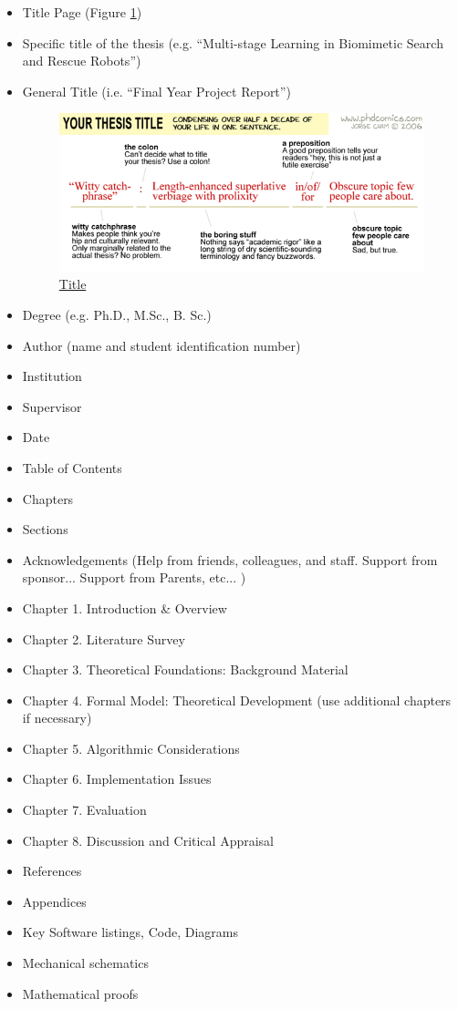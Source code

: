 \begin{itemize}
    \item Title Page (Figure \ref{fig:phd-title.png})
    \item Specific title of the thesis (e.g. “Multi-stage Learning in Biomimetic Search and Rescue Robots”)
    \item General Title (i.e. “Final Year Project Report”)
\begin{figure}[H]
    \centering
    \includegraphics[scale=0.9]{Figures/phd-title.png}
    \caption[Title]{\href{http://phdcomics.com/comics/archive_print.php?comicid=718}{Title}}
    \label{fig:phd-title.png}
\end{figure}

    \item Degree (e.g. Ph.D., M.Sc., B. Sc.)
    \item Author (name and student identification number)
    \item Institution 
    \item Supervisor
    \item Date
    \item Table of Contents
    \item Chapters
    \item Sections
    \item Acknowledgements (Help from friends, colleagues, and staff. Support from sponsor... Support from Parents, etc... )
     \item Chapter 1. Introduction & Overview
    \item Chapter 2. Literature Survey
    \item Chapter 3. Theoretical Foundations: Background Material
    \item Chapter 4. Formal Model: Theoretical Development (use additional chapters if necessary)
    \item Chapter 5. Algorithmic Considerations
    \item Chapter 6. Implementation Issues
    \item Chapter 7. Evaluation
    \item Chapter 8. Discussion and Critical Appraisal
    \item References
    \item Appendices
    \item Key Software listings, Code, Diagrams
    \item Mechanical schematics
    \item Mathematical proofs
\end{itemize}

